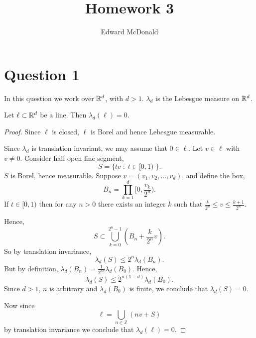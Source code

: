 \documentclass{unswmaths}
\begin{document}
\subject{Measure Theory}
\author{Edward McDonald}
\title{Homework 3}


\setlength\parindent{0pt}


\newcommand{\Bor}{\mathcal{B}(\Rl)}
\newcommand{\sdiff}{\bigtriangleup}

\unswtitle{}

\section*{Question 1}
In this question we work over $\mathbb{R}^d$, with $d > 1$. $\lambda_d$ 
is the Lebesgue measure on $\mathbb{R}^d$.
\begin{theorem}
    Let $\ell \subset \mathbb{R}^d$ be a line. Then $\lambda_d(\ell) = 0$.
\end{theorem}   
\begin{proof}
    Since $\ell$ is closed, $\ell$ is Borel and hence Lebesgue measurable.
    
    Since $\lambda_d$ is translation invariant, we may assume that 
    $0 \in \ell$. Let $v \in \ell$ with $v \neq 0$. Consider half open line segment,
    \begin{equation*}
        S = \{tv\;:\;t \in [0,1)\;\}.
    \end{equation*}
    $S$ is Borel, hence measurable. Suppose $v = (v_1,v_2,\ldots,v_d)$, and define the box,
    \begin{equation*}
        B_n = \prod_{k=1}^d [0,\frac{v_k}{2^{n}}).
    \end{equation*}
    If $t \in [0,1)$ then for any $n > 0$ there exists
    an integer $k$ such that $\frac{k}{2^n} \leq v \leq \frac{k+1}{2^n}$.
    
    Hence,
    \begin{equation*}
        S \subset \bigcup_{k=0}^{2^n-1} (B_n+\frac{k}{2^{n}}v).
    \end{equation*}
    So by translation invariance,
    \begin{equation*}
        \lambda_d(S) \leq 2^n \lambda_d(B_n).
    \end{equation*}
    But by definition, $\lambda_d(B_n) = \frac{1}{2^{nd}}\lambda_d(B_0)$.
    Hence, 
    \begin{equation*}
        \lambda_d(S) \leq 2^{n(1-d)}\lambda_d(B_0).
    \end{equation*}
    Since $d > 1$, $n$ is arbitrary and $\lambda_d(B_0)$ is finite, we
    conclude that $\lambda_d(S) = 0$.
    
    Now since
    \begin{equation*}
        \ell = \bigcup_{n\in \mathbb{Z}} (nv+S)
    \end{equation*}
    by translation invariance we conclude that $\lambda_d(\ell) = 0$.    
\end{proof}
\end{document}
